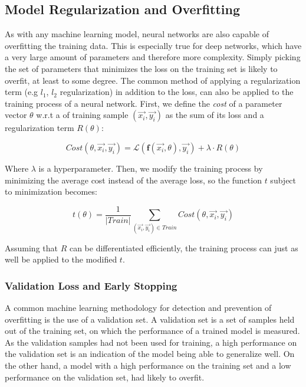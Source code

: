 \subsection{Model Regularization and Overfitting} \label{regulaization}

As with any machine learning model, neural networks are also capable of overfitting the training data. This is especially true for deep networks, which have a very large amount of parameters and therefore more complexity. Simply picking the set of parameters that minimizes the loss on the training set is likely to overfit, at least to some degree. The common method of applying a regularization term (e.g $l_1$, $l_2$ regularization) in addition to the loss, can also be applied to the training process of a neural network. First, we define the \emph{cost} of a parameter vector $\theta$ w.r.t a of training sample $(\vec{x_i}, \vec{y_i})$ as the sum of its loss and a regularization term $R(\theta)$:

$$ Cost(\theta, \vec{x_i}, \vec{y_i}) = \mathcal{L}(\textbf{f}(\vec{x_i}, \theta), \vec{y_i}) + \lambda \cdot R(\theta) $$

Where $\lambda$ is a hyperparameter. Then, we modify the training process by minimizing the average cost instead of the average loss, so the function $t$ subject to minimization becomes:

$$ t(\theta) = \frac{1}{|Train|}\sum_{(\vec{x_i}, \vec{y_i}) \in Train} Cost(\theta, \vec{x_i}, \vec{y_i}) $$

Assuming that $R$ can be differentiated efficiently, the training process can just as well be applied to the modified $t$.

\subsubsection{Validation Loss and Early Stopping}

A common machine learning methodology for detection and prevention of overfitting is the use of a validation set. A validation set is a set of samples held out of the training set, on which the performance of a trained model is measured. As the validation samples had not been used for training, a high performance on the validation set is an indication of the model being able to generalize well. On the other hand, a model with a high performance on the training set and a low performance on the validation set, had likely to overfit. 

